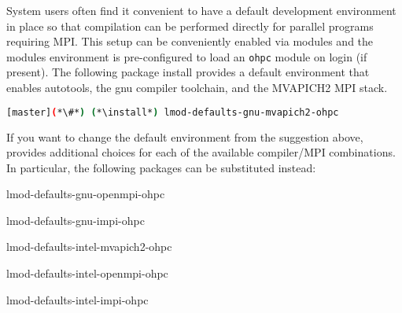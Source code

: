 System users often find it convenient to have a default development environment
in place so that compilation can be performed directly for parallel programs
requiring MPI. This setup can be conveniently enabled via modules and the \OHPC{}
modules environment is pre-configured to load an \texttt{ohpc} module on login
(if present).  The following package install provides a default
environment that enables autotools, the gnu compiler toolchain, and the
MVAPICH2 MPI stack.

\begin{lstlisting}[language=bash]
[master](*\#*) (*\install*) lmod-defaults-gnu-mvapich2-ohpc
\end{lstlisting}

\begin{center}
\begin{tcolorbox}
\small
If you want to change the default environment from the suggestion above, \OHPC{}
provides additional choices for each of the available compiler/MPI
combinations. In particular, the following packages can be substituted instead:
\begin{multicols}{2}
\begin{itemize*}
\item lmod-defaults-gnu-openmpi-ohpc
\item lmod-defaults-gnu-impi-ohpc
\item lmod-defaults-intel-mvapich2-ohpc
\item lmod-defaults-intel-openmpi-ohpc
\item lmod-defaults-intel-impi-ohpc
\end{itemize*}
\end{multicols}
\end{tcolorbox}
\end{center}
